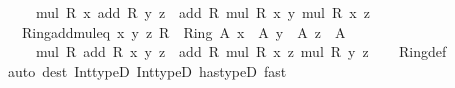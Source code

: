 \begin{isabellebody}
\ \ \ \ {\isasymLongrightarrow}\ mul\ R\ x\ {\isacharparenleft}{\kern0pt}add\ R\ y\ z{\isacharparenright}{\kern0pt}\ {\isacharequal}{\kern0pt}\ add\ R\ {\isacharparenleft}{\kern0pt}mul\ R\ x\ y{\isacharparenright}{\kern0pt}\ {\isacharparenleft}{\kern0pt}mul\ R\ x\ z{\isacharparenright}{\kern0pt}{\isachardoublequoteclose}\isanewline
\ \ \ Ring{\isacharunderscore}{\kern0pt}add{\isacharunderscore}{\kern0pt}mul{\isacharunderscore}{\kern0pt}eq{\isacharcolon}{\kern0pt}\ {\isachardoublequoteopen}{\isasymAnd}x\ y\ z{\isachardot}{\kern0pt}\ {\isasymlbrakk}R\ {\isacharcolon}{\kern0pt}\ Ring\ A{\isacharsemicolon}{\kern0pt}\ x\ {\isacharcolon}{\kern0pt}\ A{\isacharsemicolon}{\kern0pt}\ y\ {\isacharcolon}{\kern0pt}\ A{\isacharsemicolon}{\kern0pt}\ z\ {\isacharcolon}{\kern0pt}\ A{\isasymrbrakk}\isanewline
\ \ \ \ {\isasymLongrightarrow}\ mul\ R\ {\isacharparenleft}{\kern0pt}add\ R\ x\ y{\isacharparenright}{\kern0pt}\ z\ {\isacharequal}{\kern0pt}\ add\ R\ {\isacharparenleft}{\kern0pt}mul\ R\ x\ z{\isacharparenright}{\kern0pt}\ {\isacharparenleft}{\kern0pt}mul\ R\ y\ z{\isacharparenright}{\kern0pt}{\isachardoublequoteclose}\isanewline
%
\isadelimproof
\ \ %
\endisadelimproof
%
\isatagproof
{}\isamarkupfalse%
\ Ring{\isacharunderscore}{\kern0pt}def\isanewline
\ \ \isamarkupfalse%
\ {\isacharparenleft}{\kern0pt}auto\ dest{\isacharbang}{\kern0pt}{\isacharcolon}{\kern0pt}\ Int{\isacharunderscore}{\kern0pt}typeD{}\ Int{\isacharunderscore}{\kern0pt}typeD{}\ has{\isacharunderscore}{\kern0pt}typeD{\isacharparenright}{\kern0pt}\ fast%
\endisatagproof
{\isafoldproof}%
%
\isadelimproof
\isanewline
%
\endisadelimproof
\isanewline
%
\isadelimtheory
\isanewline
%
\endisadelimtheory
%
\isatagtheory
{}\isamarkupfalse%
%
\endisatagtheory
{\isafoldtheory}%
%
\isadelimtheory
%
\endisadelimtheory
%
\end{isabellebody}%
\endinput
